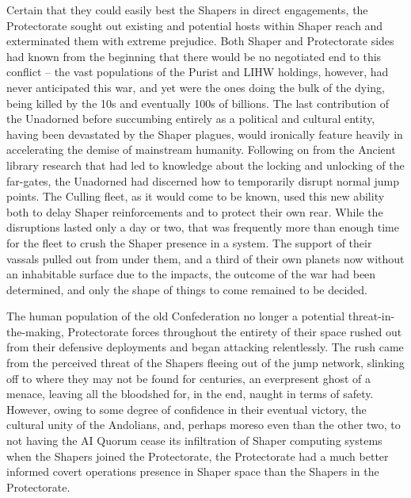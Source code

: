 Certain that they could easily best the Shapers in direct engagements, the Protectorate sought out existing and potential hosts within Shaper reach and exterminated them with extreme prejudice. Both Shaper and Protectorate sides had known from the beginning that there would be no negotiated end to this conflict – the vast populations of the Purist and LIHW holdings, however, had never anticipated this war, and yet were the ones doing the bulk of the dying, being killed by the 10s and eventually 100s of billions. The last contribution of the Unadorned before succumbing entirely as a political and cultural entity, having been devastated by the Shaper plagues, would ironically feature heavily in accelerating the demise of mainstream humanity. Following on from the Ancient library research that had led to knowledge about the locking and unlocking of the far-gates, the Unadorned had discerned how to temporarily disrupt normal jump points. The Culling fleet, as it would come to be known, used this new ability both to delay Shaper reinforcements and to protect their own rear. While the disruptions lasted only a day or two, that was frequently more than enough time for the fleet to crush the Shaper presence in a system. The support of their vassals pulled out from under them, and a third of their own planets now without an inhabitable surface due to the impacts, the outcome of the war had been determined, and only the shape of things to come remained to be decided.

The human population of the old Confederation no longer a potential threat-in-the-making, Protectorate forces throughout the entirety of their space rushed out from their defensive deployments and began attacking relentlessly. The rush came from the perceived threat of the Shapers fleeing out of the jump network, slinking off to where they may not be found for centuries, an everpresent ghost of a menace, leaving all the bloodshed for, in the end, naught in terms of safety. However, owing to some degree of confidence in their eventual victory, the cultural unity of the Andolians, and, perhaps moreso even than the other two, to not having the AI Quorum cease its infiltration of Shaper computing systems when the Shapers joined the Protectorate, the Protectorate had a much better informed covert operations presence in Shaper space than the Shapers in the Protectorate.

